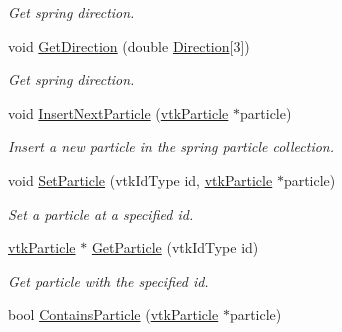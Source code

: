 \begin{DoxyCompactItemize}
\begin{DoxyCompactList}\small\item\em Get spring direction. \item\end{DoxyCompactList}\item 
\hypertarget{classvtkSpring_a2b06fc791bc515a2324dd60e4a6a1015}{
void \hyperlink{classvtkSpring_a2b06fc791bc515a2324dd60e4a6a1015}{GetDirection} (double \hyperlink{classvtkSpring_a9657e8825c7870a422f7ee4ddcf6addd}{Direction}\mbox{[}3\mbox{]})}
\label{classvtkSpring_a2b06fc791bc515a2324dd60e4a6a1015}

\begin{DoxyCompactList}\small\item\em Get spring direction. \item\end{DoxyCompactList}\item 
\hypertarget{classvtkSpring_a4d629a13d811efad9cffe32badf157ac}{
void \hyperlink{classvtkSpring_a4d629a13d811efad9cffe32badf157ac}{InsertNextParticle} (\hyperlink{classvtkParticle}{vtkParticle} $\ast$particle)}
\label{classvtkSpring_a4d629a13d811efad9cffe32badf157ac}

\begin{DoxyCompactList}\small\item\em Insert a new particle in the spring particle collection. \item\end{DoxyCompactList}\item 
\hypertarget{classvtkSpring_a871ef3d126d34aae651a077779c28b8c}{
void \hyperlink{classvtkSpring_a871ef3d126d34aae651a077779c28b8c}{SetParticle} (vtkIdType id, \hyperlink{classvtkParticle}{vtkParticle} $\ast$particle)}
\label{classvtkSpring_a871ef3d126d34aae651a077779c28b8c}

\begin{DoxyCompactList}\small\item\em Set a particle at a specified id. \item\end{DoxyCompactList}\item 
\hypertarget{classvtkSpring_acc72970d144521298e931d977b278470}{
\hyperlink{classvtkParticle}{vtkParticle} $\ast$ \hyperlink{classvtkSpring_acc72970d144521298e931d977b278470}{GetParticle} (vtkIdType id)}
\label{classvtkSpring_acc72970d144521298e931d977b278470}

\begin{DoxyCompactList}\small\item\em Get particle with the specified id. \item\end{DoxyCompactList}\item 
\hypertarget{classvtkSpring_a57af1f446ad81beabd649d13194961d3}{
bool \hyperlink{classvtkSpring_a57af1f446ad81beabd649d13194961d3}{ContainsParticle} (\hyperlink{classvtkParticle}{vtkParticle} $\ast$particle)}
\label{classvtkSpring_a57af1f446ad81beabd649d13194961d3}


\end{DoxyCompactItemize}
